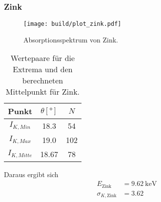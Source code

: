 \subsubsection*{Zink}
\begin{figure}[H]
    \centering
    \texttt{[image: build/plot\_zink.pdf]}
    \caption{Absorptionsspektrum von Zink.}
    \label{fig:zink}
\end{figure}
\begin{table}[H]                                                                                   
    \centering                                                                                     
        \caption{Wertepaare für die Extrema und den berechneten Mittelpunkt für Zink.}                      
        \label{tab:Zn}                                                                        
        \begin{tabular}{S S[table-format=2.2] S}                                                   
          \toprule                                                                                 
          {Punkt} & {$\theta [\si{\degree}]$} & {$N$}\\                                            
          \midrule                                                                                 
          {$I_{K,Min  }$} & 18.3  &54   \\
          {$I_{K,Max  }$} & 19.0  &102  \\
          {$I_{K,Mitte}$} & 18.67 &78   \\
          \bottomrule                                                                              
        \end{tabular}                                                                              
      \end{table}                                                                                  
Daraus ergibt sich                                                                                 
\begin{align*}                                                                                     
    E_\text{Zink} &= \SI{9.62}{\kilo\electronvolt}\\                  
    \sigma_{K, \text{Zink}} &= \num{3.62}                      
\end{align*}                                                                                       

